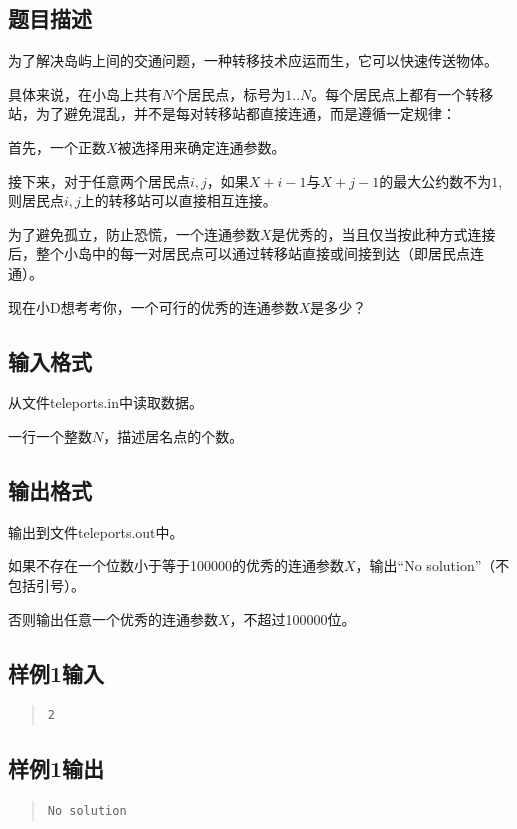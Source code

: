 \documentclass[12pt, a4paper]{article}
\begin{document}
\subsection{题目描述}

	为了解决岛屿上间的交通问题，一种转移技术应运而生，它可以快速传送物体。

	具体来说，在小岛上共有$N$个居民点，标号为$1..N$。每个居民点上都有一个转移站，为了避免混乱，并不是每对转移站都直接连通，而是遵循一定规律：

	首先，一个正数$X$被选择用来确定连通参数。
	
	接下来，对于任意两个居民点$i,j$，如果$X+i-1$与$X+j-1$的最大公约数不为$1$,则居民点$i,j$上的转移站可以直接相互连接。

	为了避免孤立，防止恐慌，一个连通参数$X$是优秀的，当且仅当按此种方式连接后，整个小岛中的每一对居民点可以通过转移站直接或间接到达（即居民点连通）。

	现在小D想考考你，一个可行的优秀的连通参数$X$是多少？

\subsection{输入格式}

	从文件teleports.in中读取数据。

	一行一个整数$N$，描述居名点的个数。

\subsection{输出格式}

	输出到文件teleports.out中。

	如果不存在一个位数小于等于100000的优秀的连通参数$X$，输出“No solution”（不包括引号）。

	否则输出任意一个优秀的连通参数$X$，不超过100000位。

\subsection{样例1输入}
\begin{quote}
\begin{verbatim}
2
\end{verbatim}
\end{quote}
\subsection{样例1输出}
\begin{quote}
\begin{verbatim}
No solution
\end{verbatim}
\end{quote}
\end{document}
